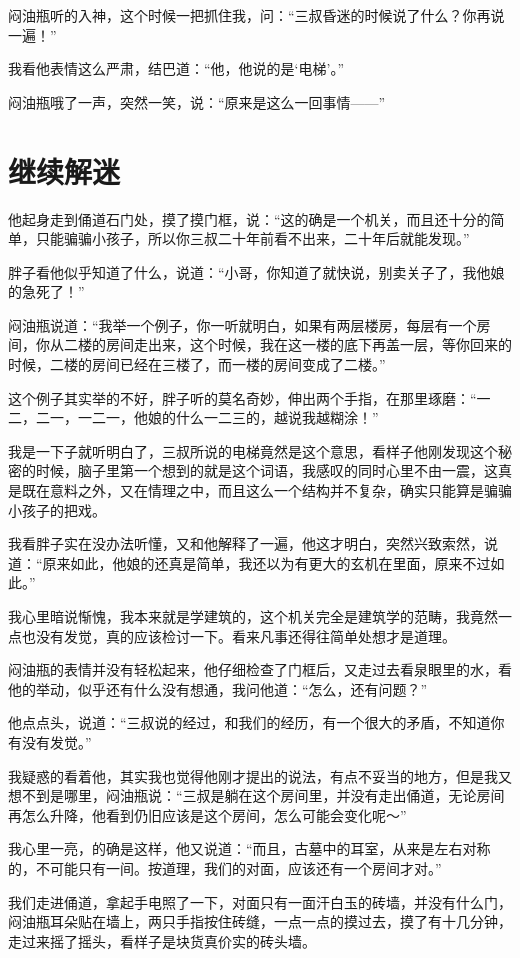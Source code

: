 闷油瓶听的入神，这个时候一把抓住我，问：“三叔昏迷的时候说了什么？你再说一遍！”

我看他表情这么严肃，结巴道：“他，他说的是‘电梯’。”

闷油瓶哦了一声，突然一笑，说：“原来是这么一回事情——”

\chapter{继续解迷}

他起身走到俑道石门处，摸了摸门框，说：“这的确是一个机关，而且还十分的简单，只能骗骗小孩子，所以你三叔二十年前看不出来，二十年后就能发现。”

胖子看他似乎知道了什么，说道：“小哥，你知道了就快说，别卖关子了，我他娘的急死了！”

闷油瓶说道：“我举一个例子，你一听就明白，如果有两层楼房，每层有一个房间，你从二楼的房间走出来，这个时候，我在这一楼的底下再盖一层，等你回来的时候，二楼的房间已经在三楼了，而一楼的房间变成了二楼。”

这个例子其实举的不好，胖子听的莫名奇妙，伸出两个手指，在那里琢磨：“一二，二一，一二一，他娘的什么一二三的，越说我越糊涂！”

我是一下子就听明白了，三叔所说的电梯竟然是这个意思，看样子他刚发现这个秘密的时候，脑子里第一个想到的就是这个词语，我感叹的同时心里不由一震，这真是既在意料之外，又在情理之中，而且这么一个结构并不复杂，确实只能算是骗骗小孩子的把戏。

我看胖子实在没办法听懂，又和他解释了一遍，他这才明白，突然兴致索然，说道：“原来如此，他娘的还真是简单，我还以为有更大的玄机在里面，原来不过如此。”

我心里暗说惭愧，我本来就是学建筑的，这个机关完全是建筑学的范畴，我竟然一点也没有发觉，真的应该检讨一下。看来凡事还得往简单处想才是道理。

闷油瓶的表情并没有轻松起来，他仔细检查了门框后，又走过去看泉眼里的水，看他的举动，似乎还有什么没有想通，我问他道：“怎么，还有问题？”

他点点头，说道：“三叔说的经过，和我们的经历，有一个很大的矛盾，不知道你有没有发觉。”

我疑惑的看着他，其实我也觉得他刚才提出的说法，有点不妥当的地方，但是我又想不到是哪里，闷油瓶说：“三叔是躺在这个房间里，并没有走出俑道，无论房间再怎么升降，他看到仍旧应该是这个房间，怎么可能会变化呢～”

我心里一亮，的确是这样，他又说道：“而且，古墓中的耳室，从来是左右对称的，不可能只有一间。按道理，我们的对面，应该还有一个房间才对。”

我们走进俑道，拿起手电照了一下，对面只有一面汗白玉的砖墙，并没有什么门，闷油瓶耳朵贴在墙上，两只手指按住砖缝，一点一点的摸过去，摸了有十几分钟，走过来摇了摇头，看样子是块货真价实的砖头墙。

